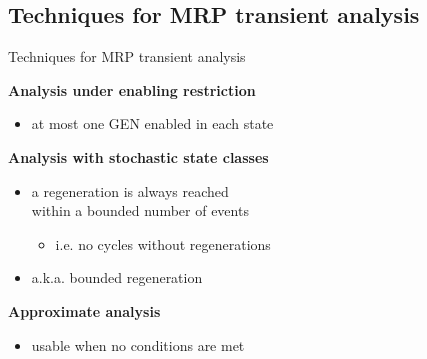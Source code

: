   \subsection{Techniques for MRP transient analysis}
    \begin{frame}{Techniques for MRP transient analysis}
      \begin{minipage}{0.6\textwidth}
        \textbf{Analysis under enabling restriction}\footnotemark
        \begin{itemize}
          \item at most one GEN enabled in each state
        \end{itemize}
      \end{minipage}
      \begin{minipage}{0.35\textwidth}
        \begin{center}\scalebox{0.45}{}\end{center}
      \end{minipage}
      
      \begin{minipage}{0.6\textwidth}
        \textbf{Analysis with stochastic state classes}\footnotemark
        \begin{itemize}
          \item a regeneration is always reached\\
            within a bounded number of events
          \begin{itemize}
            \item i.e. no cycles without regenerations
          \end{itemize}
          \item a.k.a. bounded regeneration
        \end{itemize}
      \end{minipage}
      \begin{minipage}{0.35\textwidth}
        \begin{center}\scalebox{0.45}{}\end{center}
      \end{minipage}
      
      \begin{minipage}{0.6\textwidth}
        \textbf{Approximate analysis}
        \begin{itemize}
          \item usable when no conditions are met
        \end{itemize}
      \end{minipage}
      \begin{minipage}{0.35\textwidth}
        \begin{center}\scalebox{0.45}{}\end{center}
      \end{minipage}
      

\end{frame}
